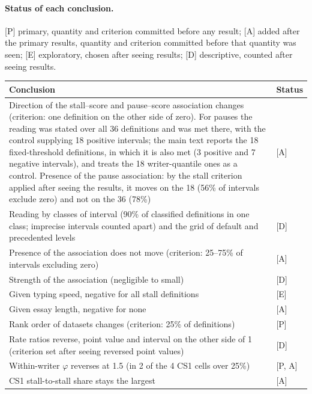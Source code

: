 \paragraph{Status of each conclusion.} [P] primary, quantity and criterion committed before any result; [A] added
after the primary results, quantity and criterion committed before that quantity was seen; [E] exploratory, chosen
after seeing results; [D] descriptive, counted after seeing results.

\begin{center}\footnotesize
\begin{tabularx}{\textwidth}{@{}X l@{}}
\toprule
Conclusion & Status \\
\midrule
Direction of the stall--score and pause--score association changes (criterion: one definition on the other side of
zero). For pauses the reading was stated over all 36 definitions and was met there, with the control supplying 18
positive intervals; the main text reports the 18 fixed-threshold definitions, in which it is also met (3 positive and
7 negative intervals), and treats the 18 writer-quantile ones as a control. Presence of the pause association: by the stall criterion applied after seeing the results, it moves on the
18 (56\% of intervals exclude zero) and not on the 36 (78\%) & [A] \\
Reading by classes of interval (90\% of classified definitions in one class; imprecise intervals counted apart) and
the grid of default and precedented levels & [D] \\
Presence of the association does not move (criterion: 25--75\% of intervals excluding zero) & [A] \\
Strength of the association (negligible to small) & [D] \\
Given typing speed, negative for all stall definitions & [E] \\
Given essay length, negative for none & [A] \\
Rank order of datasets changes (criterion: 25\% of definitions) & [P] \\
Rate ratios reverse, point value and interval on the other side of 1 (criterion set after seeing reversed point values) & [D] \\
Within-writer $\varphi$ reverses at 1.5 (in 2 of the 4 CS1 cells over 25\%) & [P, A] \\
CS1 stall-to-stall share stays the largest & [A] \\
\bottomrule
\end{tabularx}
\end{center}

